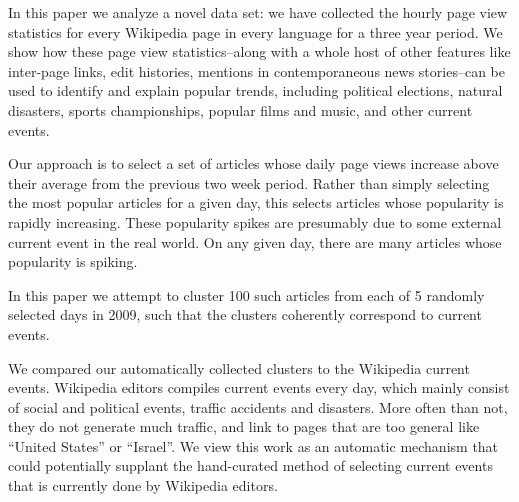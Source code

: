 \documentclass[11pt]{article}
\begin{document}


In this paper we analyze a novel data set: we have collected the hourly page view statistics for every Wikipedia page in every language for a three year period. We show how these page view statistics--along with a whole host of other features like inter-page links, edit histories, mentions in contemporaneous news stories--can be used to identify and explain popular trends, including political elections, natural disasters, sports championships, popular films and music, and other current events.

Our approach is to select a set of articles whose daily page views increase above their average from the previous two week period. Rather than simply selecting the most popular articles for a given day, this selects articles whose popularity is rapidly increasing. These popularity spikes are presumably due to some external current event in the real world. On any given day, there are many articles whose popularity is spiking.

In this paper we attempt to cluster 100 such articles from each of 5 randomly selected days in 2009, such that the clusters coherently correspond to current events.

We compared our automatically collected clusters to the Wikipedia current events. Wikipedia editors compiles current events every day, which mainly consist of social and political events, traffic accidents and disasters. More often than not, they do not generate much traffic, and link to pages that are too general like ``United States'' or ``Israel''. We view this work as an automatic mechanism that could potentially supplant the hand-curated method of selecting current events that is currently done by Wikipedia editors.
\end{document}
